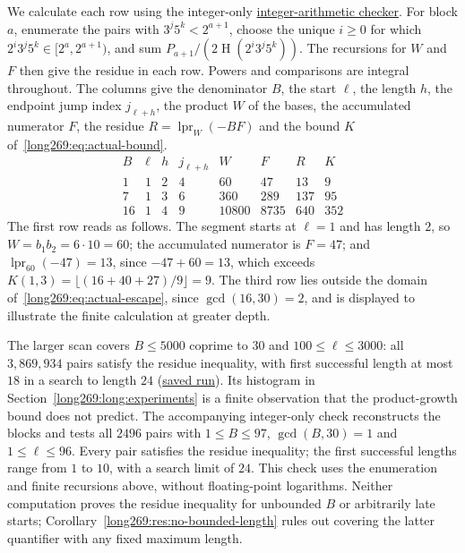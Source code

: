 \documentclass[11pt]{article}
\theoremstyle{remark}
\theoremstyle{plain}
\newcommand{\hgt}{\operatorname{H}}
\newcommand{\lpr}{\operatorname{lpr}}
\begin{document}
We calculate each row using the integer-only
\href{\sourceurl/scripts/check_erdos269_dyadic_windows.py}{integer-arithmetic checker}.
For block $a$, enumerate the pairs with $3^j5^k<2^{a+1}$, choose the unique
$i\ge0$ for which $2^i3^j5^k\in[2^a,2^{a+1})$, and sum
$P_{a+1}/(2\hgt(2^i3^j5^k))$. The recursions for $W$ and $F$ then give
the residue in each row. Powers and comparisons are integral throughout.
The columns give the denominator $B$, the start
$\ell$, the length $h$, the endpoint jump index $j_{\ell+h}$, the product
$W$ of the bases, the accumulated numerator $F$, the residue
$R=\lpr_W(-BF)$ and the bound $K$ of~\eqref{long269:eq:actual-bound}.
\[
\begin{array}{c|c|c|c|r|r|r|r}
B&\ell&h&j_{\ell+h}&W&F&R&K\\ \hline
1&1&2&4&60&47&13&9\\
7&1&3&6&360&289&137&95\\
16&1&4&9&10800&8735&640&352
\end{array}
\]
The first row reads as follows.  The segment starts at $\ell=1$ and has length
$2$, so $W=b_1b_2=6\cdot10=60$; the accumulated numerator is $F=47$; and
$\lpr_{60}(-47)=13$, since $-47+60=13$, which exceeds
$K(1,3)=\lfloor(16+40+27)/9\rfloor=9$.  The third row lies outside the domain
of~\eqref{long269:eq:actual-escape}, since $\gcd(16,30)=2$, and is displayed to
illustrate the finite calculation at greater depth.

The larger scan covers $B\le5000$ coprime to $30$ and
$100\le\ell\le3000$: all $3{,}869{,}934$ pairs satisfy the residue inequality, with first successful length
at most $18$ in a search to length $24$
(\href{https://github.com/wcook04/plectis-erdos/blob/f757115e03bebe5c04431a147da559015c680a37/research/experiments/erdos269/large-computations/receipts/scan-5000-100-3000.json}{saved run}).
Its histogram in Section~\ref{long269:long:experiments} is a finite
observation that the product-growth bound does not predict.
The accompanying integer-only check reconstructs the blocks
and tests all $2496$ pairs with $1\le B\le97$, $\gcd(B,30)=1$ and
$1\le\ell\le96$.  Every pair satisfies the residue inequality; the first successful lengths range
from $1$ to $10$, with a search limit of $24$.  This check uses the
enumeration and finite recursions above, without floating-point
logarithms.  Neither computation proves the residue inequality for unbounded $B$ or
arbitrarily late starts; Corollary~\ref{long269:res:no-bounded-length}
rules out covering the latter quantifier with any fixed maximum length.
\end{document}
